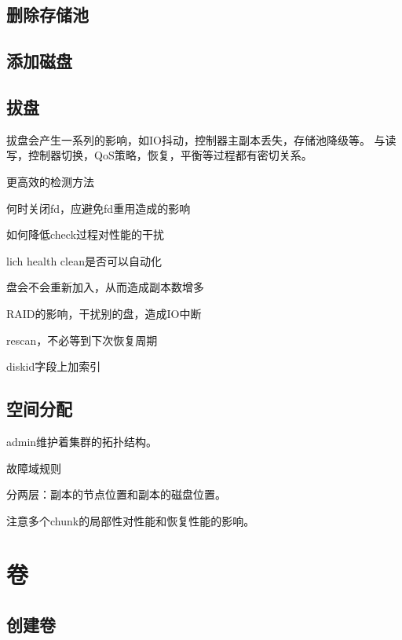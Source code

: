 \subsection{删除存储池}

\subsection{添加磁盘}


\subsection{拔盘}

拔盘会产生一系列的影响，如IO抖动，控制器主副本丢失，存储池降级等。
与读写，控制器切换，QoS策略，恢复，平衡等过程都有密切关系。

\begin{compactenum}
\item 更高效的检测方法
\item 何时关闭fd，应避免fd重用造成的影响
\item 如何降低check过程对性能的干扰
\item lich health clean是否可以自动化
\item 盘会不会重新加入，从而造成副本数增多
\item RAID的影响，干扰别的盘，造成IO中断
\item rescan，不必等到下次恢复周期
\end{compactenum}

diskid字段上加索引

\subsection{空间分配}

admin维护着集群的拓扑结构。

故障域规则

分两层：副本的节点位置和副本的磁盘位置。

注意多个chunk的局部性对性能和恢复性能的影响。

\section{卷}

\subsection{创建卷}

